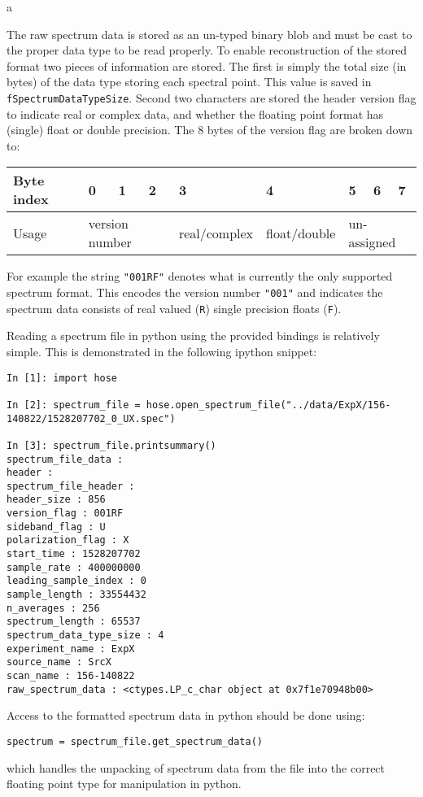 a\documentclass[a4paper,14pt]{article}
\begin{document}
The raw spectrum data is stored as an un-typed binary blob and must be cast to the proper data type to be read properly. To enable reconstruction of the stored format two pieces of information are stored.
The first is simply the total size (in bytes) of the data type storing each spectral point. This value is saved in \verb|fSpectrumDataTypeSize|. Second two characters are stored the header version flag
to indicate real or complex data, and whether the floating point format has (single) float or double precision. 
The 8 bytes of the version flag are broken down to:
\begin{table}[h!]
\centering
\begin{tabular}{|l|l|l|l|l|l|l|l|l|}
\hline
 Byte index &    0   &    1   &   2    &  3 & 4 &   5    &     6  &  7     \\ \hline
  Usage & \multicolumn{3}{l|}{version number} & real/complex  & float/double & \multicolumn{3}{l|}{un-assigned} \\ \hline
\end{tabular}
\end{table}
For example the string \verb|"001RF"| denotes what is currently the only supported spectrum format. This encodes the version number \verb|"001"| and indicates the spectrum data consists of real valued (\verb|R|) single precision floats (\verb|F|).

Reading a spectrum file in python using the provided bindings is relatively simple. This is demonstrated in the following ipython snippet:
\begin{lstlisting}
In [1]: import hose

In [2]: spectrum_file = hose.open_spectrum_file("../data/ExpX/156-140822/1528207702_0_UX.spec")

In [3]: spectrum_file.printsummary()
spectrum_file_data :
header :
spectrum_file_header :
header_size : 856
version_flag : 001RF
sideband_flag : U
polarization_flag : X
start_time : 1528207702
sample_rate : 400000000
leading_sample_index : 0
sample_length : 33554432
n_averages : 256
spectrum_length : 65537
spectrum_data_type_size : 4
experiment_name : ExpX
source_name : SrcX
scan_name : 156-140822
raw_spectrum_data : <ctypes.LP_c_char object at 0x7f1e70948b00>
\end{lstlisting}
Access to the formatted spectrum data in python should be done using:
\begin{lstlisting}
spectrum = spectrum_file.get_spectrum_data()
\end{lstlisting}
which handles the unpacking of spectrum data from the file into the correct floating point type for manipulation in python.
\end{document}
